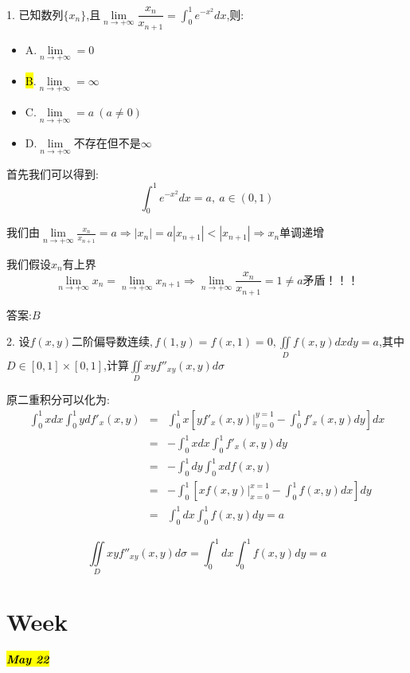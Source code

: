 1. 已知数列$\{x_{n}\}$,且$\lim\limits_{n\rightarrow +\infty}\dfrac{x_{n}}{x_{n+1}}=\int_{0}^{1}e^{-x^2}dx$,则: 
\begin{itemize}
	\item A.$\lim\limits_{n\rightarrow +\infty}=0$
	\item \hl{B}.$\lim\limits_{n\rightarrow +\infty}=\infty$
	\item C.$\lim\limits_{n\rightarrow +\infty}=a\ (a\neq 0)$
	\item D.$\lim\limits_{n\rightarrow +\infty}\text{不存在但不是}\infty$
\end{itemize}
\begin{solution}
	
	首先我们可以得到: 
	$$\int_{0}^{1}e^{-x^2}dx=a,\ a\in(0,1)$$
	
	我们由$\lim\limits_{n\rightarrow +\infty}\frac{x_{n}}{x_{n+1}}=a\Rightarrow |x_{n}|=a|x_{n+1}|<|x_{n+1}|\Rightarrow x_{n}\text{单调递增}$
	
	我们假设$x_{n}$有上界
	$$\lim\limits_{n\rightarrow +\infty}x_{n}=\lim\limits_{n\rightarrow +\infty}x_{n+1}\Rightarrow \lim\limits_{n\rightarrow +\infty}\frac{x_{n}}{x_{n+1}}=1\neq a\text{矛盾！！！}$$
	
	答案:$B$
\end{solution}

2. 设$f(x,y)\text{二阶偏导数连续},f(1,y)=f(x,1)=0,\iint\limits_{D}f(x,y)dxdy=a$,其中$D\in [0,1]\times [0,1]$,计算$\iint\limits_{D}xyf''_{xy}(x,y)d\sigma$
\begin{solution}
	
	原二重积分可以化为: 
	\begin{eqnarray*}
		\int_{0}^{1}xdx\int_{0}^{1}ydf'_{x}(x,y)&=&\int_{0}^{1}x\left[yf'_{x}(x,y)|_{y=0}^{y=1}-\int_{0}^{1}f'_{x}(x,y)dy\right]dx\\
		&=&-\int_{0}^{1}xdx\int_{0}^{1}f'_{x}(x,y)dy\\
		&=&-\int_{0}^{1}dy\int_{0}^{1}xdf(x,y)\\
		&=&-\int_{0}^{1}\left[xf(x,y)|_{x=0}^{x=1}-\int_{0}^{1}f(x,y)dx\right]dy\\
		&=&\int_{0}^{1}dx\int_{0}^{1}f(x,y)dy=a
	\end{eqnarray*}
	
	$$\iint\limits_{D}xyf''_{xy}(x,y)d\sigma=\int_{0}^{1}dx\int_{0}^{1}f(x,y)dy=a$$
\end{solution}

\section{Week }
\hl{\textbf{\textit{May 22}}}


